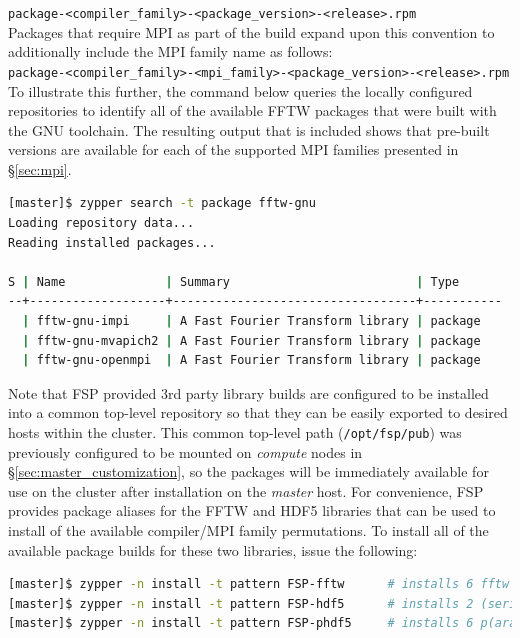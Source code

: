 \documentclass[letterpaper]{article}
\begin{document}
{\noindent
\texttt{package-<compiler\_family>-<package\_version>-<release>.rpm} \\

\noindent Packages that require MPI as part of the build expand upon this convention to
additionally include the MPI family name as follows: \\

\noindent
\texttt{package-<compiler\_family>-<mpi\_family>-<package\_version>-<release>.rpm} \\

To illustrate this further, the command below queries the locally configured
repositories to identify all of the available FFTW packages that were built
with the GNU toolchain. The resulting output that is included shows that
pre-built versions are available for each of the supported MPI families
presented in \S\ref{sec:mpi}.

\begin{lstlisting}[language=bash]
[master]$ zypper search -t package fftw-gnu
Loading repository data...
Reading installed packages...

S | Name              | Summary                          | Type      
--+-------------------+----------------------------------+-----------
  | fftw-gnu-impi     | A Fast Fourier Transform library | package   
  | fftw-gnu-mvapich2 | A Fast Fourier Transform library | package   
  | fftw-gnu-openmpi  | A Fast Fourier Transform library | package   
\end{lstlisting}

Note that FSP provided 3rd party library builds are configured to be installed
into a common top-level repository so that they can be easily exported to
desired hosts within the cluster. This common top-level path (\texttt{/opt/fsp/pub})
was previously configured to be mounted on {\em compute} nodes in
\S\ref{sec:master_customization}, so the packages will be immediately available
for use on the cluster after installation on the {\em master} host.  For
convenience, FSP provides package aliases for the FFTW and HDF5 libraries that
can be used to install of the available compiler/MPI family permutations. To
install all of the available package builds for these two libraries, issue the
following:

\begin{lstlisting}[language=bash]
[master]$ zypper -n install -t pattern FSP-fftw      # installs 6 fftw packages
[master]$ zypper -n install -t pattern FSP-hdf5      # installs 2 (serial) hdf5 packages
[master]$ zypper -n install -t pattern FSP-phdf5     # installs 6 p(arallel) hdf5 packages
\end{lstlisting}

}
\end{document}

